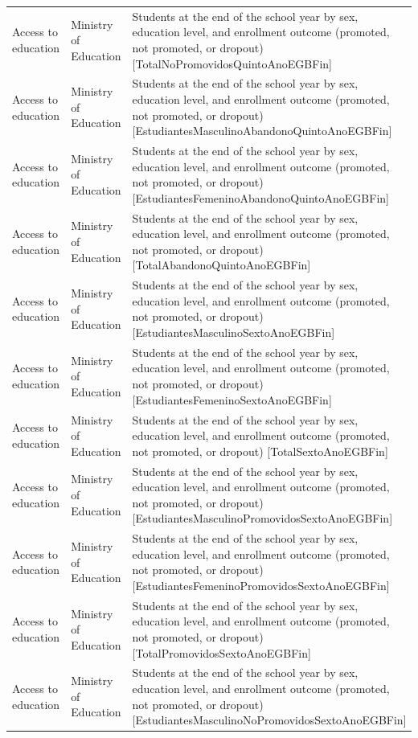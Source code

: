 \documentclass[10pt,a4paper]{article}
\begin{document}
\begin{longtable}{@{}>{\raggedright\arraybackslash}p{3.5cm}>{\raggedright\arraybackslash}p{5.6cm}>{\raggedright\arraybackslash}p{\dimexpr\textwidth-9.1cm-4\tabcolsep\relax}@{}}
Access to education & Ministry of Education & Students at the end of the school year by sex, education level, and enrollment outcome (promoted, not promoted, or dropout) [TotalNoPromovidosQuintoAnoEGBFin]\\
Access to education & Ministry of Education & Students at the end of the school year by sex, education level, and enrollment outcome (promoted, not promoted, or dropout) [EstudiantesMasculinoAbandonoQuintoAnoEGBFin]\\
Access to education & Ministry of Education & Students at the end of the school year by sex, education level, and enrollment outcome (promoted, not promoted, or dropout) [EstudiantesFemeninoAbandonoQuintoAnoEGBFin]\\
Access to education & Ministry of Education & Students at the end of the school year by sex, education level, and enrollment outcome (promoted, not promoted, or dropout) [TotalAbandonoQuintoAnoEGBFin]\\
Access to education & Ministry of Education & Students at the end of the school year by sex, education level, and enrollment outcome (promoted, not promoted, or dropout) [EstudiantesMasculinoSextoAnoEGBFin]\\
Access to education & Ministry of Education & Students at the end of the school year by sex, education level, and enrollment outcome (promoted, not promoted, or dropout) [EstudiantesFemeninoSextoAnoEGBFin]\\
Access to education & Ministry of Education & Students at the end of the school year by sex, education level, and enrollment outcome (promoted, not promoted, or dropout) [TotalSextoAnoEGBFin]\\
Access to education & Ministry of Education & Students at the end of the school year by sex, education level, and enrollment outcome (promoted, not promoted, or dropout) [EstudiantesMasculinoPromovidosSextoAnoEGBFin]\\
Access to education & Ministry of Education & Students at the end of the school year by sex, education level, and enrollment outcome (promoted, not promoted, or dropout) [EstudiantesFemeninoPromovidosSextoAnoEGBFin]\\
Access to education & Ministry of Education & Students at the end of the school year by sex, education level, and enrollment outcome (promoted, not promoted, or dropout) [TotalPromovidosSextoAnoEGBFin]\\
Access to education & Ministry of Education & Students at the end of the school year by sex, education level, and enrollment outcome (promoted, not promoted, or dropout) [EstudiantesMasculinoNoPromovidosSextoAnoEGBFin]\\

\end{longtable}
\end{document}

